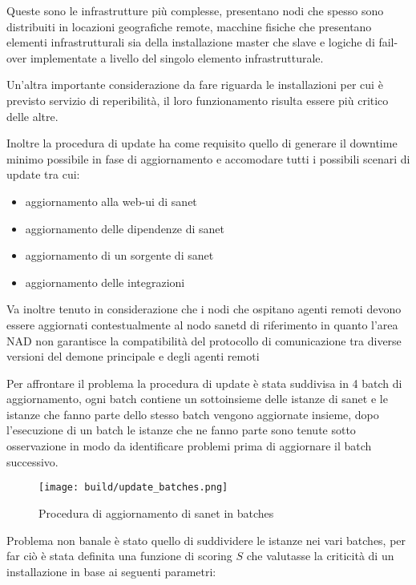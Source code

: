 Queste sono le infrastrutture più complesse, presentano nodi che spesso sono distribuiti in locazioni geografiche remote, macchine fisiche che presentano elementi infrastrutturali sia della installazione master che slave e logiche di fail-over implementate a livello del singolo elemento infrastrutturale.

Un'altra importante considerazione da fare riguarda le installazioni per cui è previsto servizio di reperibilità, il loro funzionamento risulta essere più critico delle altre.

Inoltre la procedura di update ha come requisito quello di generare il downtime minimo possibile in fase di aggiornamento e accomodare tutti i possibili scenari di update tra cui:

\begin{itemize}
  \item{aggiornamento alla web-ui di sanet}
  \item{aggiornamento delle dipendenze di sanet}
  \item{aggiornamento di un sorgente di sanet}
  \item{aggiornamento delle integrazioni}
\end{itemize}

Va inoltre tenuto in considerazione che i nodi che ospitano agenti remoti devono essere aggiornati contestualmente al nodo sanetd di riferimento in quanto l'area NAD non garantisce la compatibilità del protocollo di comunicazione tra diverse versioni del demone principale e degli agenti remoti

Per affrontare il problema la procedura di update è stata suddivisa in 4 batch di aggiornamento, ogni batch contiene un sottoinsieme delle istanze di sanet e le istanze che fanno parte dello stesso batch vengono aggiornate insieme, dopo l'esecuzione di un batch le istanze che ne fanno parte sono tenute sotto osservazione in modo da identificare problemi prima di aggiornare il batch successivo.

\begin{figure}[H]
    \centering
    \texttt{[image: build/update\_batches.png]}
    \caption{Procedura di aggiornamento di sanet in batches}
    \label{fig:update_batches}
\end{figure}

Problema non banale è stato quello di suddividere le istanze nei vari batches, per far ciò è stata definita una funzione di scoring \(S\) che valutasse la criticità di un installazione in base ai seguenti parametri:

